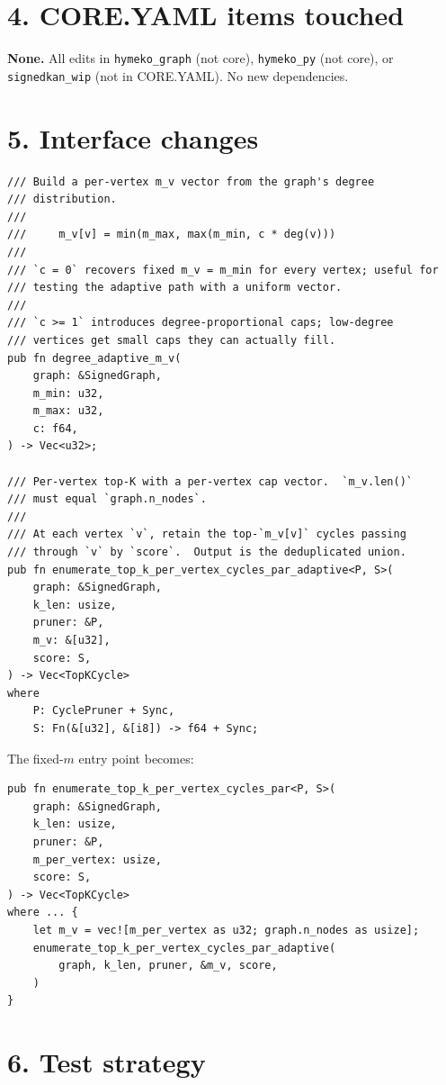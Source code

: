 \documentclass[a4paper,11pt]{article}
\begin{document}
\section*{4. CORE.YAML items touched}

\textbf{None.}  All edits in \texttt{hymeko\_graph} (not core),
\texttt{hymeko\_py} (not core), or \texttt{signedkan\_wip} (not in
CORE.YAML).  No new dependencies.

\section*{5. Interface changes}

\begin{lstlisting}
/// Build a per-vertex m_v vector from the graph's degree
/// distribution.
///
///     m_v[v] = min(m_max, max(m_min, c * deg(v)))
///
/// `c = 0` recovers fixed m_v = m_min for every vertex; useful for
/// testing the adaptive path with a uniform vector.
///
/// `c >= 1` introduces degree-proportional caps; low-degree
/// vertices get small caps they can actually fill.
pub fn degree_adaptive_m_v(
    graph: &SignedGraph,
    m_min: u32,
    m_max: u32,
    c: f64,
) -> Vec<u32>;

/// Per-vertex top-K with a per-vertex cap vector.  `m_v.len()`
/// must equal `graph.n_nodes`.
///
/// At each vertex `v`, retain the top-`m_v[v]` cycles passing
/// through `v` by `score`.  Output is the deduplicated union.
pub fn enumerate_top_k_per_vertex_cycles_par_adaptive<P, S>(
    graph: &SignedGraph,
    k_len: usize,
    pruner: &P,
    m_v: &[u32],
    score: S,
) -> Vec<TopKCycle>
where
    P: CyclePruner + Sync,
    S: Fn(&[u32], &[i8]) -> f64 + Sync;
\end{lstlisting}

The fixed-$m$ entry point becomes:

\begin{lstlisting}
pub fn enumerate_top_k_per_vertex_cycles_par<P, S>(
    graph: &SignedGraph,
    k_len: usize,
    pruner: &P,
    m_per_vertex: usize,
    score: S,
) -> Vec<TopKCycle>
where ... {
    let m_v = vec![m_per_vertex as u32; graph.n_nodes as usize];
    enumerate_top_k_per_vertex_cycles_par_adaptive(
        graph, k_len, pruner, &m_v, score,
    )
}
\end{lstlisting}

\section*{6. Test strategy}
\end{document}
